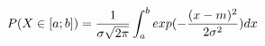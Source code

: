 \documentclass[preview]{standalone}
\begin{document}
\begin{align*}
P( X \in [a;b] )
                = { \frac{1}{\sigma \sqrt{2\pi}} } \int_a^b { exp(-{ \frac{(x - m)^2}{2 \sigma^2} }) } \space dx
\end{align*}
\end{document}
